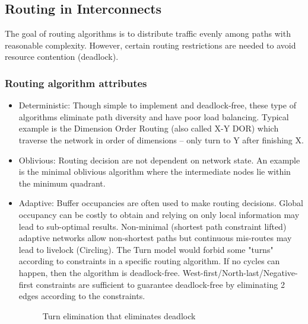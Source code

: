 \documentclass{article}
\begin{document}
\begin{multicols*}{2}
\subsection{Routing in Interconnects}
The goal of routing algorithms is to distribute traffic evenly among paths with reasonable complexity. However, certain routing restrictions are needed to avoid resource contention (deadlock).

\subsubsection{Routing algorithm attributes}
\begin{itemize}
    \item Deterministic: Though simple to implement and deadlock-free, these type of algorithms eliminate path diversity and have poor load balancing.
    \medskip\noindent\newline
    Typical example is the Dimension Order Routing (also called X-Y DOR) which traverse the network in order of dimensions -- only turn to Y after finishing X.
    \item Oblivious: Routing decision are not dependent on network state. An example is the minimal oblivious algorithm where the intermediate nodes lie within the minimum quadrant.
    \item Adaptive: Buffer occupancies are often used to make routing decisions. Global occupancy can be costly to obtain and relying on only local information may lead to sub-optimal results. 
    \medskip\noindent\newline
    Non-minimal (shortest path constraint lifted) adaptive networks allow non-shortest paths but continuous mis-routes may lead to livelock (Circling).
    \medskip\noindent\newline
    The Turn model would forbid some "turns" according to constraints in a specific routing algorithm. If no cycles can happen, then the algorithm is deadlock-free. West-first/North-last/Negative-first constraints are sufficient to guarantee deadlock-free by eliminating 2 edges according to the constraints.
    \begin{figure}[H]
        \caption{Turn elimination that eliminates deadlock}
    \end{figure}        
\end{itemize}


\end{multicols*}
\end{document}
